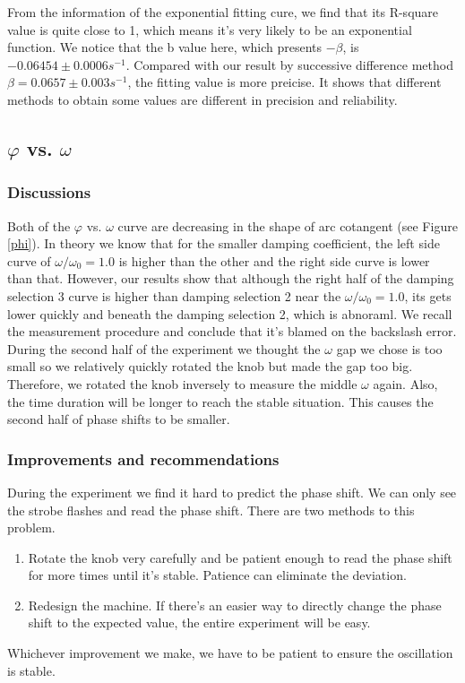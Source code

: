 
	From the information of the exponential fitting cure, we find that its R-square value is quite close to 1, which means it's very likely to be an exponential function. We notice that the b value here, which presents $-\beta$, is $-0.06454\pm 0.0006s^{-1}$. Compared with our result by successive difference method $\beta=0.0657\pm 0.003s^{-1}$, the fitting value is more preicise. It shows that different methods to obtain some values are different in precision and reliability.
	


\subsection{$\varphi$ vs. $\omega$}
\subsubsection{Discussions}
    Both of the $\varphi$ vs. $\omega$ curve are decreasing in the shape of arc cotangent (see Figure \ref{phi}). In theory we know that for the smaller damping coefficient, the left side curve of $\omega/\omega_0=1.0$ is higher than the other and the right side curve is lower than that. However, our results show that although the right half of the damping selection 3 curve is higher than damping selection 2 near the $\omega/\omega_0=1.0$, its gets lower quickly and beneath the damping selection 2, which is abnoraml. We recall the measurement procedure and conclude that it's blamed on the backslash error. During the second half of the experiment we thought the $\omega$ gap we chose is too small so we relatively quickly rotated the knob but made the gap too big. Therefore, we rotated the knob inversely to measure the middle $\omega$ again. Also, the time duration will be longer to reach the stable situation. This causes the second half of phase shifts to be smaller.

\subsubsection{Improvements and recommendations}
    During the experiment we find it hard to predict the phase shift. We can only see the strobe flashes and read the phase shift. There are two methods to this problem.
    \begin{enumerate}
        \item Rotate the knob very carefully and be patient enough to read the phase shift for more times until it's stable. Patience can eliminate the deviation.
        \item Redesign the machine. If there's an easier way to directly change the phase shift to the expected value, the entire experiment will be easy.
    \end{enumerate}
    Whichever improvement we make, we have to be patient to ensure the oscillation is stable.

